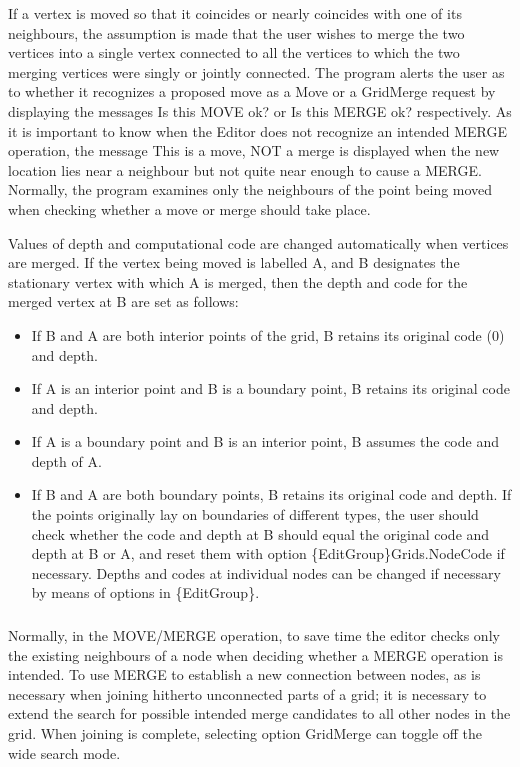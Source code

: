 \documentclass{article}
\begin{document}
If a vertex is moved so that it coincides or nearly coincides with one of its neighbours, the assumption is made that the user wishes to merge the two vertices into a single vertex connected to all the vertices to which the two merging vertices were singly or jointly connected. The program alerts the user as to whether it recognizes a proposed move as a Move or a GridMerge request by displaying the messages {\textquotedbl}Is this MOVE ok?{\textquotedbl} or {\textquotedbl}Is this MERGE ok?{\textquotedbl} respectively. As it is important to know when the Editor does not recognize an intended MERGE operation, the message {\textquotedbl}This is a move, NOT a merge{\textquotedbl} is displayed when the new location lies near a neighbour but not quite near enough to cause a MERGE. Normally, the program examines only the neighbours of the point being moved when checking whether a move or merge should take place.

Values of depth and computational code are changed automatically when vertices are merged. If the vertex being moved is labelled A, and B designates the stationary vertex with which A is merged, then the depth and code for the merged vertex at B are set as follows:

\begin{itemize}
\item If B and A are both interior points of the grid, B retains its original code (0) and depth.
\item If A is an interior point and B is a boundary point, B retains its original code and depth.
\item If A is a boundary point and B is an interior point, B assumes the code and depth of A.
\item If B and A are both boundary points, B retains its original code and depth. If the points originally lay on boundaries of different types, the user should check whether the code and depth at B should equal the original code and depth at B or A, and reset them with option \{EditGroup\}Grids.NodeCode if necessary. Depths and codes at individual nodes can be changed if necessary by means of options in \{EditGroup\}.
\end{itemize}

\bigskip

\subsubsection*{}
Normally, in the MOVE/MERGE operation, to save time the editor checks only the existing neighbours of a node when deciding whether a MERGE operation is intended. To use MERGE to establish a new connection between nodes, as is necessary when joining hitherto unconnected parts of a grid; it is necessary to extend the search for possible intended merge candidates to all other nodes in the grid. When joining is complete, selecting option GridMerge can toggle off the wide search mode.
\end{document}
